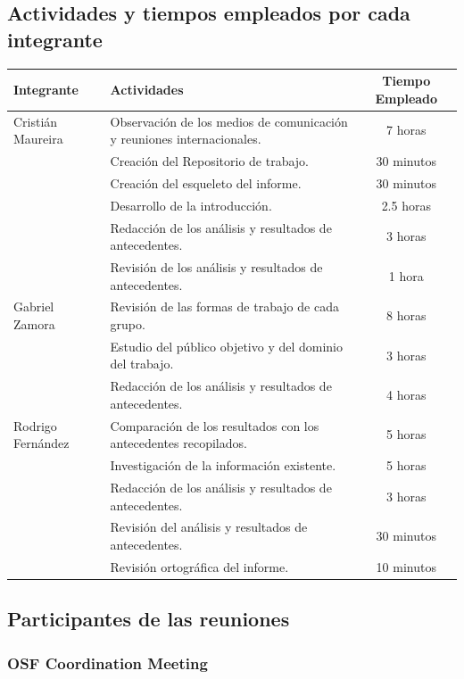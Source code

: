



\subsection{Actividades y tiempos empleados por cada integrante}

\begin{tabular}{|l|p{7cm}|c|}
\hline
Integrante & Actividades & Tiempo Empleado \\\hline
Cristián Maureira & Observación de los medios de comunicación y reuniones internacionales. & 7 horas \\
& Creación del Repositorio de trabajo. & 30 minutos \\
& Creación del esqueleto del informe.& 30 minutos \\
& Desarrollo de la introducción. & 2.5 horas \\
& Redacción de los análisis y resultados de antecedentes. & 3 horas \\
& Revisión de los análisis y resultados de antecedentes. & 1 hora \\
\hline
Gabriel Zamora & Revisión de  las formas de trabajo de cada grupo. & 8 horas \\
& Estudio del público objetivo y del dominio del trabajo. & 3 horas \\
& Redacción de los análisis y resultados de antecedentes. & 4 horas \\
\hline
Rodrigo Fernández & Comparación de los resultados con los antecedentes
recopilados. & 5 horas \\
& Investigación de la información existente. & 5 horas \\
& Redacción de los análisis y resultados de antecedentes. & 3 horas \\
& Revisión del análisis y resultados de antecedentes. & 30 minutos \\
& Revisión ortográfica del informe. & 10 minutos \\
\hline
\end{tabular}
\newpage
\subsection{Participantes de las reuniones}
\subsubsection{OSF Coordination Meeting}

